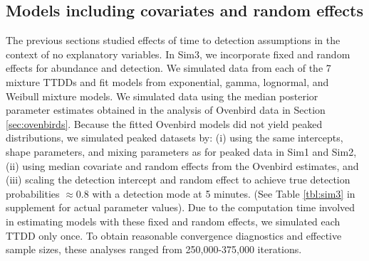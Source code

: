 \documentclass[useAMS,usenatbib,referee,12pt]{article}
\begin{document}
% 





\subsection{Models including covariates and random effects}\label{sec:simfull}

The previous sections studied effects of time to detection assumptions in the context of no explanatory variables.
In Sim3, we incorporate fixed and random effects for abundance and detection. 
We simulated data from each of the 7 mixture TTDDs and fit models from exponential, gamma, lognormal, and Weibull mixture models.  
We simulated data using the median posterior parameter estimates obtained in the analysis of Ovenbird data in Section \ref{sec:ovenbirds}.
Because the fitted Ovenbird models did not yield peaked distributions, we simulated peaked datasets by: (i) using the same intercepts, shape parameters, and mixing parameters as for peaked data in Sim1 and Sim2, (ii) using median covariate and random effects from the Ovenbird estimates, and (iii) scaling the detection intercept and random effect to achieve true detection probabilities $\approx 0.8$ with a detection mode at 5 minutes.
(See Table \ref{tbl:sim3} in supplement for actual parameter values).
Due to the computation time involved in estimating models with these fixed and random effects, we simulated each TTDD only once.
To obtain reasonable convergence diagnostics and effective sample sizes, these analyses ranged from 250,000-375,000 iterations.
\end{document}
